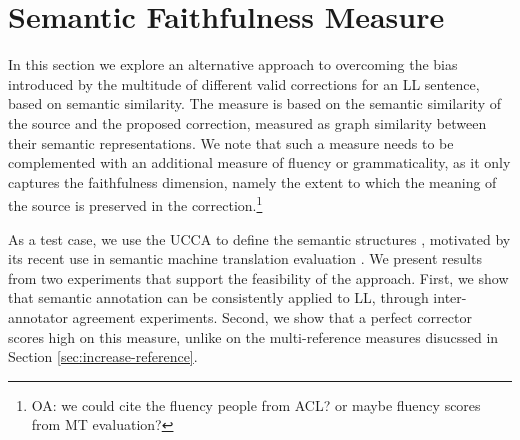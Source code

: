 \documentclass[letter,11pt]{article}
\newcommand{\com}[1]{}
\newcommand{\oa}[1]{\footnote{\color{red}OA: #1}}
\newcommand{\lc}[1]{\footnote{\color{green}LC: #1}}
\begin{document}
		\com{\lc{I think this can be omitted}
			So, why is significance more complicated? Basically, because variance is more complex than mean. While $\mathbb{E}_{y\sim d_x, x\sim L}\left(\hat{S}\right)$ vary only as we change $M$
			the number of annotations, but not $N$ the number of corrections,
			$Var_{y\sim d_x, x\sim L}(\hat{S})$ depends on both. We try to assess and give an upper
			bound on how much it varies for different $M$ and $N$, allowing
			for both a smart allocation of resources when building a corpus and for assessing on given corpora whether two correctors are actually different.
		}
		

\section{Semantic Faithfulness Measure}\label{sec:Semantics}



In this section we explore an alternative approach to overcoming the bias
introduced by the multitude of different valid corrections for an LL sentence, based
on semantic similarity.
The measure is based on the semantic similarity of the source and the proposed correction,
measured as graph similarity between their semantic representations.
We note that such a measure needs to be complemented with an additional
measure of fluency or grammaticality, as it only captures
the faithfulness dimension, namely the extent to which
the meaning of the source is preserved in the correction.\oa{we could cite the fluency people from ACL? or maybe fluency scores from MT evaluation?}

As a test case, we use the UCCA to define the semantic structures \cite{abend2013universal}, motivated by
its recent use in semantic machine translation evaluation \cite{birch2016hume}.
We present results from two experiments that support the feasibility of the approach.
First, we show that semantic annotation can be consistently applied to LL,
through inter-annotator agreement experiments.
Second, we show that a perfect corrector scores high on this measure, unlike on
the multi-reference measures disucssed in Section \ref{sec:increase-reference}.
\end{document}
